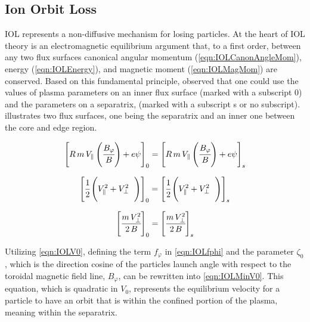 \subsection{Ion Orbit Loss} \label{sub:IOL}

\acf{IOL} represents a non-diffusive mechanism for losing particles. At the heart of \ac{IOL} theory is an electromagnetic equilibrium argument that, to a first order, between any two flux surfaces canonical angular momentum (\cref{eqn:IOLCanonAngleMom}), energy (\cref{eqn:IOLEnergy}), and magnetic moment (\cref{eqn:IOLMagMom}) are conserved. Based on this fundamental principle, \citeauthor{Miyamoto1996} \cite{Miyamoto1996} observed that one could use the values of plasma parameters on an inner flux surface (marked with a subscript 0) and the parameters on a separatrix, (marked with a subscript s or no subscript).  illustrates two flux surfaces, one being the separatrix and an inner one between the core and edge region.

\begin{equation}
	\left[ R\, m\, V_\parallel \left(\cfrac{B_\varphi}{B}\right) + e \psi \right]_0
	=
	\left[ R\, m\, V_\parallel \left(\cfrac{B_\varphi}{B}\right) + e \psi \right]_s 
	\label{eqn:IOLCanonAngleMom}
\end{equation}

\begin{equation}
	\left[ \cfrac{1}{2} \left( V_\parallel^2 + V_\perp^2  \phantom{\cfrac{1}{2}}\right) \right]_0
	=
	\left[ \cfrac{1}{2} \left( V_\parallel^2 + V_\perp^2  \phantom{\cfrac{1}{2}}\right) \right]_s
	\label{eqn:IOLEnergy}	
\end{equation}

\begin{equation}
	\left[ \cfrac{m\,V_\perp^2}{2\,B} \right]_0
	=
	\left[ \cfrac{m\,V_\perp^2}{2\,B} \right]_s
	\label{eqn:IOLMagMom}
\end{equation}

Utilizing \cref{eqn:IOLV0}, defining the term $f_\varphi$ in \cref{eqn:IOLfphi} and the parameter $\zeta_0$, which is the direction cosine of the particles launch angle with respect to the toroidal magnetic field line, $B_\varphi$,  can be rewritten into \cref{eqn:IOLMinV0}. This equation, which is quadratic in $V_0$, represents the equilibrium velocity for a particle to have an orbit that is within the confined portion of the plasma, meaning within the separatrix.


